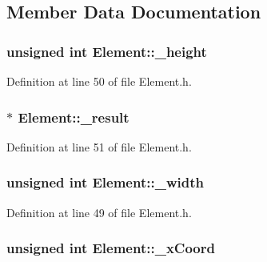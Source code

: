 \subsection{Member Data Documentation}
\hypertarget{class_element_a6118137bfca71319ebaaa0d87be60cf3}{
\subsubsection[{\-\_\-height}]{\setlength{\rightskip}{0pt plus 5cm}unsigned int Element\-::\-\_\-height\hspace{0.3cm}{\ttfamily [protected]}}}\label{class_element_a6118137bfca71319ebaaa0d87be60cf3}


Definition at line 50 of file Element.\-h.

\hypertarget{class_element_ac79e1d8bac0f2b6d23f9ae156d4b6cce}{
\subsubsection[{\-\_\-result}]{$\ast$ Element\-::\-\_\-result\hspace{0.3cm}{\ttfamily [protected]}}}\label{class_element_ac79e1d8bac0f2b6d23f9ae156d4b6cce}


Definition at line 51 of file Element.\-h.

\hypertarget{class_element_a559a2b7894e65668aee75346a3976f86}{
\subsubsection[{\-\_\-width}]{\setlength{\rightskip}{0pt plus 5cm}unsigned int Element\-::\-\_\-width\hspace{0.3cm}{\ttfamily [protected]}}}\label{class_element_a559a2b7894e65668aee75346a3976f86}


Definition at line 49 of file Element.\-h.

\hypertarget{class_element_a53e4a4ffd5e4e60ce40f55f910d11f23}{
\subsubsection[{\-\_\-x\-Coord}]{\setlength{\rightskip}{0pt plus 5cm}unsigned int Element\-::\-\_\-x\-Coord\hspace{0.3cm}{\ttfamily [protected]}}}\label{class_element_a53e4a4ffd5e4e60ce40f55f910d11f23}


